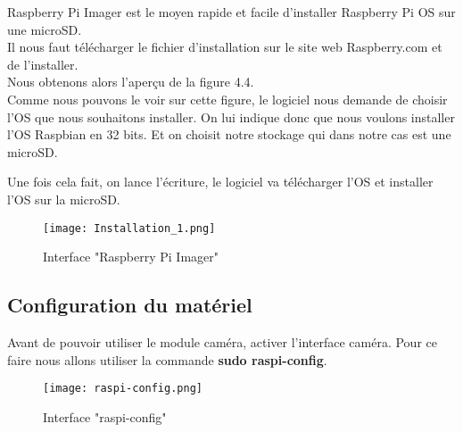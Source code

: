             \begin{flushleft}
                Raspberry Pi Imager est le moyen rapide et facile d'installer Raspberry Pi OS sur une microSD.\\[0.2cm]

                Il nous faut télécharger le fichier d'installation sur le site web Raspberry.com et de l'installer.\\[0.2cm]

                Nous obtenons alors l'aperçu de la figure 4.4.\\[0.2cm]
                Comme nous pouvons le voir sur cette figure, le logiciel nous demande de choisir l'OS que nous souhaitons installer.
                On lui indique donc que nous voulons installer l'OS Raspbian en 32 bits. Et on choisit notre stockage qui dans notre cas est une microSD.

                \vspace{0.2cm}

                Une fois cela fait, on lance l'écriture, le logiciel va télécharger l'OS et installer l'OS sur la microSD.


            \begin{figure}[t]
                \centering
                \texttt{[image: Installation\_1.png]} 
                \caption{Interface "Raspberry Pi Imager"}
            \end{figure}


            \end{flushleft}
    
            \subsection{Configuration du matériel}
            Avant de pouvoir utiliser le module caméra, activer l'interface caméra.
            Pour ce faire nous allons utiliser la commande \textbf{sudo raspi-config}.

            \begin{figure}[h]
                \centering
                \texttt{[image: raspi-config.png]} 
                \caption{Interface "raspi-config"}
            \end{figure}

